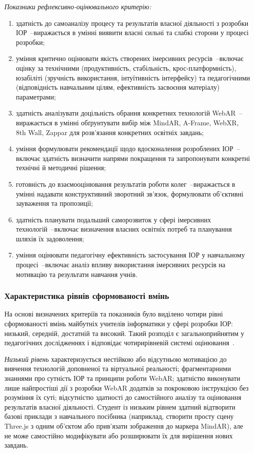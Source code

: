 \textit{Показники рефлексивно-оцінювального критерію:}
\begin{enumerate}
\item здатність до самоаналізу процесу та результатів власної діяльності з розробки ІОР~--виражається в умінні виявити власні сильні та слабкі сторони у процесі розробки;
\item уміння критично оцінювати якість створених імерсивних ресурсів~--включає оцінку за технічними (продуктивність, стабільність, крос-платформність), юзабіліті (зручність використання, інтуїтивність інтерфейсу) та педагогічними (відповідність навчальним цілям, ефективність засвоєння матеріалу) параметрами;
\item здатність аналізувати доцільність обрання конкретних технологій WebAR~--виражається в умінні обґрунтувати вибір між MindAR, A-Frame, WebXR, 8th Wall, Zappar для розв'язання конкретних освітніх завдань;
\item уміння формулювати рекомендації щодо вдосконалення розроблених ІОР~--включає здатність визначити напрями покращення та запропонувати конкретні технічні й методичні рішення;
\item готовність до взаємооцінювання результатів роботи колег~--виражається в умінні надавати конструктивний зворотний зв'язок, формулювати об'єктивні зауваження та пропозиції;
\item здатність планувати подальший саморозвиток у сфері імерсивних технологій~--включає визначення власних освітніх потреб та планування шляхів їх задоволення;
\item уміння оцінювати педагогічну ефективність застосування ІОР у навчальному процесі~--включає аналіз впливу використання імерсивних ресурсів на мотивацію та результати навчання учнів.
\end{enumerate}

\subsubsection{Характеристика рівнів сформованості вмінь}

На основі визначених критеріїв та показників було виділено чотири рівні сформованості вмінь майбутніх учителів інформатики у сфері розробки ІОР: низький, середній, достатній та високий. Такий розподіл є загальноприйнятим у педагогічних дослідженнях і відповідає чотирирівневій системі оцінювання~\cite{Fitsula2006Pedagogics}.

\textit{Низький рівень} характеризується нестійкою або відсутньою мотивацією до вивчення технологій доповненої та віртуальної реальності; фрагментарними знаннями про сутність ІОР та принципи роботи WebAR; здатністю виконувати лише найпростіші дії з розробки WebAR додатків за покроковою інструкцією без розуміння їх суті; відсутністю здатності до самостійного аналізу та оцінювання результатів власної діяльності. Студент із низьким рівнем здатний відтворити базові приклади з навчального посібника (наприклад, створити просту сцену Three.js з одним об'єктом або прив'язати зображення до маркера MindAR), але не може самостійно модифікувати або розширювати їх для вирішення нових завдань.

